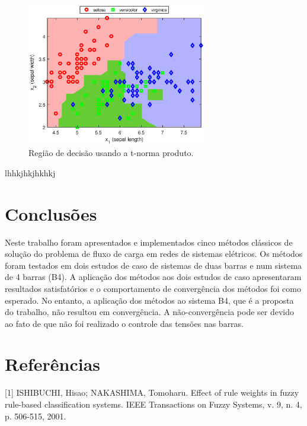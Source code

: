 \documentclass[12pt,a4paper]{article}
\numberwithin{equation}{section}
\begin{document}
\begin{figure}[ht]
\centering
\includegraphics[width=0.7\textwidth]{product.eps}
\caption{Região de decisão usando a t-norma produto.}
\label{fig:produst}
\end{figure}

lhhkjhkjhkhkj

\newpage
\section{Conclusões}

Neste trabalho foram apresentados e implementados cinco métodos clássicos de solução
do problema de fluxo de carga em redes de sistemas elétricos.
Os métodos foram testados em dois estudos de caso de sistemas de duas barras e num sistema
de 4 barras (B4).
A aplicação dos métodos aos dois estudos de caso apresentaram resultados satisfatórios
e o comportamento de convergência dos métodos foi como esperado. 
No entanto, a aplicação dos métodos ao sistema B4, que é a proposta do trabalho, não 
resultou em convergência. A não-convergência pode ser devido ao fato de que não foi
realizado o controle das tensões nas barras. 

\newpage

\section*{Referências}
%

[1] ISHIBUCHI, Hisao; NAKASHIMA, Tomoharu. Effect of rule weights in fuzzy rule-based classification systems. IEEE Transactions on Fuzzy Systems, v. 9, n. 4, p. 506-515, 2001.
\end{document}
